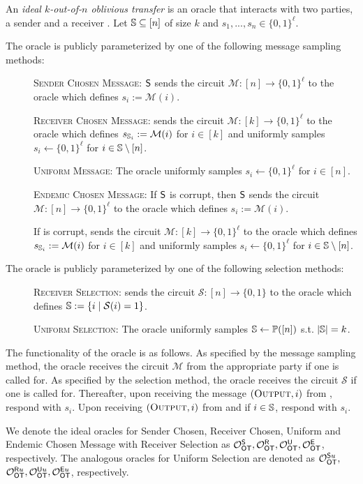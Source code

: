 \begin{definition}\label{def:ot}
An \emph{ideal $k$-out-of-$n$ oblivious transfer} is an oracle that interacts with two parties, a sender \send and a receiver \rec. Let $\mathsf{\mathbb S}\subseteq[n]$ of size $k$ and  $s_1,...,s_n\in \{0,1\}^\ell$.

The oracle is publicly parameterized by one of the following message sampling methods:
\begin{description}
\item[] \textsc{Sender Chosen Message:} $\mathsf{S}$ sends the circuit $\mathcal{M} : [n] \rightarrow \{0,1\}^\ell$ to the oracle which defines $s_i:=\mathcal{M}(i)$.

\item[] \textsc{Receiver Chosen Message:} \rec sends the circuit  $\mathcal{M} : [k] \rightarrow \{0,1\}^\ell$ to the oracle which defines $s_{\mathsf{\mathbb S}_i}:=\mathcal{M}(i)$ for $i\in[k]$ and uniformly samples $s_i\gets\{0,1\}^\ell$ for $i\in\mathsf{\mathbb S}\setminus[n]$.

\item[] \textsc{Uniform Message:} The oracle uniformly samples $s_i\gets\{0,1\}^{\ell}$ for $i\in[n]$. 
 
\item[] \textsc{Endemic Chosen Message:} If $\mathsf{S}$ is corrupt, then $\mathsf{S}$ sends the circuit $\mathcal{M} : [n] \rightarrow \{0,1\}^\ell$ to the oracle which defines $s_i:=\mathcal{M}(i)$.

If \rec is corrupt, \rec sends the circuit  $\mathcal{M} : [k] \rightarrow \{0,1\}^\ell$ to the oracle which defines $s_{\mathsf{\mathbb S}_i}:=\mathcal{M}(i)$ for $i\in[k]$ and uniformly samples $s_i\gets\{0,1\}^\ell$ for $i\in\mathsf{\mathbb S}\setminus[n]$.
\end{description}

The oracle is publicly parameterized by one of the following selection methods:
\begin{description}
	\item[] \textsc{Receiver Selection:} \rec sends the circuit $\mathcal{S}:[n]\rightarrow\{0,1\}$ to the oracle which defines $\mathsf{\mathbb S}:=\{i \mid \mathcal{S}(i)=1\}$.
	\item[] \textsc{Uniform Selection:} The oracle uniformly samples $\mathsf{\mathbb S}\gets\mathbb{P}([n])$ s.t. $|\mathsf{\mathbb S}|=k$.
\end{description}

The functionality of the oracle is as follows. As specified by the message sampling method, the oracle receives the circuit $\mathcal{M}$ from the appropriate party if one is called for.  As specified by the selection method, the oracle receives the circuit $\mathcal{S}$ if one is called for. 
Thereafter, upon receiving the message $(\textsc{Output}, i)$ from \send, respond with $s_i$. Upon receiving $(\textsc{Output}, i)$ from \rec and if $i\in \mathsf{\mathbb S}$,  respond with $s_i$. 

We denote the ideal oracles for Sender Chosen, Receiver Chosen, Uniform and Endemic Chosen Message with Receiver Selection as $\mathcal{O}_{\mathsf{OT}}^\mathsf{S}, \mathcal{O}_{\mathsf{OT}}^\mathsf{R},\mathcal{O}_{\mathsf{OT}}^\mathsf{U},\mathcal{O}_{\mathsf{OT}}^\mathsf{E}$, respectively. The analogous oracles for Uniform Selection are denoted as  $\mathcal{O}_{\mathsf{OT}}^{\mathsf{S} u},$ $\mathcal{O}_{\mathsf{OT}}^{\mathsf{R} u}, \mathcal{O}_{\mathsf{OT}}^{\mathsf{U} u}, \mathcal{O}_{\mathsf{OT}}^{\mathsf{E} u}$, respectively.
\end{definition}
